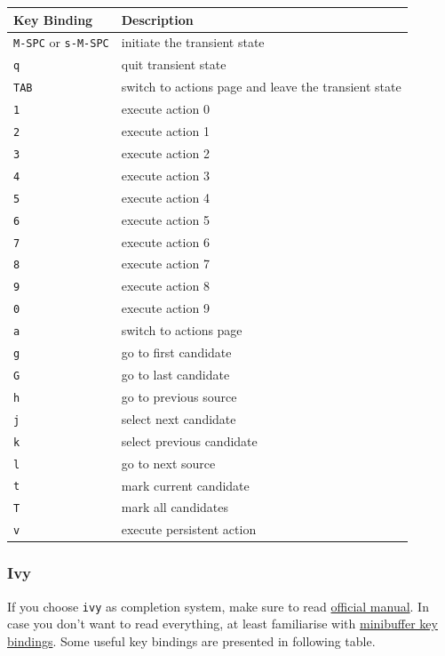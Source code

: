 \documentclass[11pt]{article}
\begin{document}
\begin{enumerate}
\begin{center}
\begin{tabular}{ll}
Key Binding & Description\\
\hline
\texttt{M-SPC} or \texttt{s-M-SPC} & initiate the transient state\\
\texttt{q} & quit transient state\\
\texttt{TAB} & switch to actions page and leave the transient state\\
\texttt{1} & execute action 0\\
\texttt{2} & execute action 1\\
\texttt{3} & execute action 2\\
\texttt{4} & execute action 3\\
\texttt{5} & execute action 4\\
\texttt{6} & execute action 5\\
\texttt{7} & execute action 6\\
\texttt{8} & execute action 7\\
\texttt{9} & execute action 8\\
\texttt{0} & execute action 9\\
\texttt{a} & switch to actions page\\
\texttt{g} & go to first candidate\\
\texttt{G} & go to last candidate\\
\texttt{h} & go to previous source\\
\texttt{j} & select next candidate\\
\texttt{k} & select previous candidate\\
\texttt{l} & go to next source\\
\texttt{t} & mark current candidate\\
\texttt{T} & mark all candidates\\
\texttt{v} & execute persistent action\\
\end{tabular}
\end{center}
\end{enumerate}

\subsubsection{Ivy}
\label{sec:orgb30d5c4}
If you choose \texttt{ivy} as completion system, make sure to read \href{http://oremacs.com/swiper/}{official manual}. In
case you don't want to read everything, at least familiarise with \href{http://oremacs.com/swiper/\#minibuffer-key-bindings}{minibuffer key
bindings}. Some useful key bindings are presented in following table.
\end{document}
